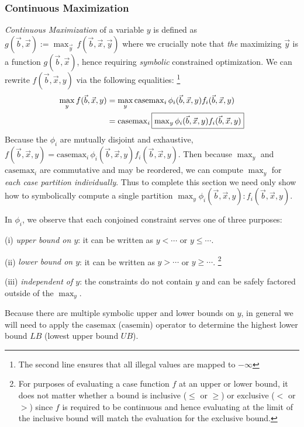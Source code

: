 \documentclass[twoside,11pt]{article}
\newcommand{\casemax}{\mathrm{casemax}}
\newcommand{\casemin}{\mathrm{casemin}}
\newcommand{\UB}{\mathit{UB}}
\newcommand{\LB}{\mathit{LB}}
\begin{document}
\subsubsection*{Continuous Maximization}
\emph{Continuous Maximization} of a variable $y$ is defined as $g(\vec{b},\vec{x}) := \max_{\vec{y}}
\, f(\vec{b},\vec{x},\vec{y})$ where we crucially note that 
\emph{the} maximizing $\vec{y}$ is a function
$g(\vec{b},\vec{x})$, hence requiring \emph{symbolic} 
constrained optimization. We can rewrite $f(\vec{b},\vec{x},y)$ via 
the following equalities:
\footnote{The second line ensures that all illegal values are mapped to $-\infty$}
{%
\begin{align}
\max_y f(\vec{b},\vec{x},y) & = 
\max_y \casemax_i \, \phi_i(\vec{b},\vec{x},y) f_i(\vec{b},\vec{x},y) \nonumber \\
& = \casemax_i \, \fbox{$\max_y \phi_i(\vec{b},\vec{x},y) f_i(\vec{b},\vec{x},y)$} \label{eq:casemax_max}
\end{align}
}
Because the 
$\phi_i$ are mutually disjoint and exhaustive, 
$f(\vec{b},\vec{x},y) = \casemax_i \, \phi_i(\vec{b},\vec{x},y) f_i(\vec{b},\vec{x},y)$.  
Then because 
$\max_y$ and $\casemax_i$ are commutative and may be reordered,
we can compute $\max_y$ for \emph{each case partition
individually}.  Thus to complete this section we need only
show how to symbolically compute a single partition 
$\max_y \phi_i(\vec{b},\vec{x},y): f_i(\vec{b},\vec{x},y)$.

In $\phi_i$, we observe that each conjoined constraint serves one of
three purposes: 

(i) \emph{upper bound on $y$}: it can be written
as $y < \cdots$ or $y \leq \cdots$.

(ii) \emph{lower bound on $y$}: it can be written as $y >
\cdots$ or $y \geq \cdots$.
\footnote{For purposes of evaluating
a case function $f$ at an upper or lower bound,
it does not matter whether a bound is inclusive ($\leq$ or $\geq$)
or exclusive ($<$ or $>$) since $f$ is required to be continuous
and hence evaluating at the limit of the inclusive bound will
match the evaluation for the exclusive bound.}

(iii) \emph{independent of $y$}: the constraints do not contain $y$
and can be safely factored outside of the $\max_y$.

Because there are multiple symbolic upper and lower
bounds on $y$, in general we will need to apply the $\casemax$
($\casemin$) operator to determine the highest lower bound $\LB$
(lowest upper bound $\UB$).
\end{document}
